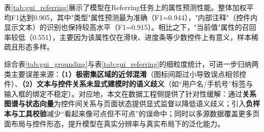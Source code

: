 表\ref{tab:gui_referring}展示了模型在Referring任务上的属性预测性能。整体加权平均F1达到0.905，其中"类型"属性预测最为准确（F1=0.944），"内部注释"（控件内显示文本）的识别也保持较高水平（F1=0.915）。相比之下，"当前值"属性的召回率较低（0.551），主要因为该属性仅在滑块、进度条等少数控件上有意义，样本稀疏且形态多样。

\begin{table}[htbp]
\centering
\small
\renewcommand{\arraystretch}{1.2}
\caption{Referring任务各属性预测性能。}
\label{tab:gui_referring}
\end{table}

综合表\ref{tab:gui_grounding}与表\ref{tab:gui_referring}的细粒度统计，可进一步归纳两类主要误差来源：\textbf{（1）极密集区域的近邻混淆}（图标间距过小导致误点相邻控件）、\textbf{（2）文本与控件关系未显式建模时的语义歧义}（如“用户名/手机号”标签与输入框的绑定不稳定）。对应地，本文在数据工程侧提供了针对性缓解：通过\textbf{关系图谱与状态向量}为控件间关系与页面状态提供显式监督以降低语义歧义；引入\textbf{负样本与工具校验}减少“看起来像可点但不可点”的误命中；同时以多源数据覆盖更多页面布局与控件形态，提升模型在真实分辨率与真实布局下的泛化能力。

